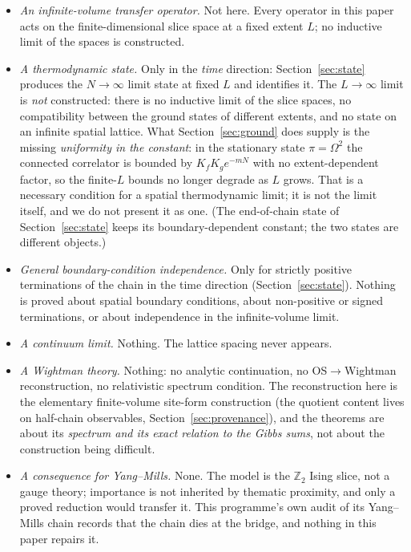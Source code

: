\documentclass[11pt]{article}
\begin{document}
\begin{itemize}
\item \emph{An infinite-volume transfer operator.}  Not here.  Every
operator in this paper acts on the finite-dimensional slice space at a
fixed extent $L$; no inductive limit of the spaces is constructed.
\item \emph{A thermodynamic state.}  Only in the \emph{time} direction:
Section~\ref{sec:state} produces the $N\to\infty$ limit state at fixed
$L$ and identifies it.  The $L\to\infty$ limit is \emph{not}
constructed: there is no inductive limit of the slice spaces, no
compatibility between the ground states of different extents, and no
state on an infinite spatial lattice.  What Section~\ref{sec:ground}
does supply is the missing \emph{uniformity in the constant}: in the
stationary state $\pi = \Omega^2$ the connected correlator is bounded
by $K_fK_g e^{-mN}$ with no extent-dependent factor, so the finite-$L$
bounds no longer degrade as $L$ grows.  That is a necessary condition
for a spatial thermodynamic limit; it is not the limit itself, and we
do not present it as one.  (The end-of-chain state of
Section~\ref{sec:state} keeps its boundary-dependent constant; the two
states are different objects.)
\item \emph{General boundary-condition independence.}  Only for
strictly positive terminations of the chain in the time direction
(Section~\ref{sec:state}).  Nothing is proved about spatial boundary
conditions, about non-positive or signed terminations, or about
independence in the infinite-volume limit.
\item \emph{A continuum limit.}  Nothing.  The lattice spacing never
appears.
\item \emph{A Wightman theory.}  Nothing: no analytic continuation, no
OS$\to$Wightman reconstruction, no relativistic spectrum condition.
The reconstruction here is the elementary finite-volume site-form
construction (the quotient content lives on half-chain observables,
Section~\ref{sec:provenance}), and the theorems are about its
\emph{spectrum and its exact relation to the Gibbs sums}, not about
the construction being difficult.
\item \emph{A consequence for Yang--Mills.}  None.  The model is the
$\mathbb{Z}_2$ Ising slice, not a gauge theory; importance is not
inherited by thematic proximity, and only a proved reduction would
transfer it.  This programme's own audit of its Yang--Mills chain
records that the chain dies at the bridge, and nothing in this paper
repairs it.
\end{itemize}
\end{document}
